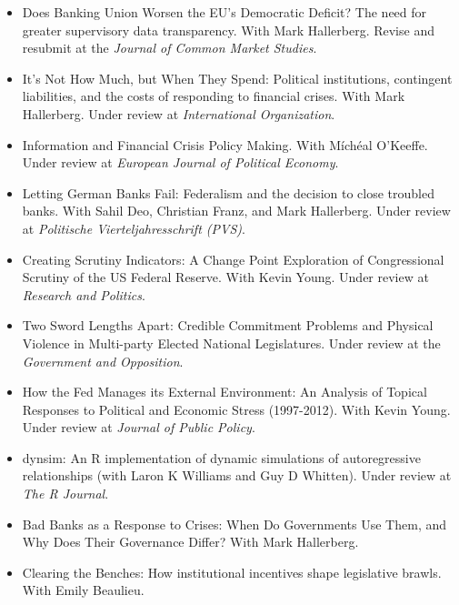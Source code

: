 \documentclass[a4paper]{article}
\begin{document}
{{\begin{itemize}
    \item Does Banking Union Worsen the EU's Democratic Deficit? The need for greater supervisory data transparency. With Mark Hallerberg. Revise and resubmit at the {\emph{Journal of Common Market Studies}}.

    \item It's Not How Much, but When They Spend: Political institutions, contingent liabilities, and the costs of responding to financial crises. With Mark Hallerberg. Under review at \emph{International Organization}.

    \item Information and Financial Crisis Policy Making. With M\'{i}ch\'{e}al O'Keeffe. Under review at {\emph{European Journal of Political Economy}}.

    \item Letting German Banks Fail: Federalism and the decision to close troubled banks. With Sahil Deo, Christian Franz, and Mark Hallerberg. Under review at \emph{Politische Vierteljahresschrift (PVS)}.

    \item Creating Scrutiny Indicators: A Change Point Exploration of Congressional Scrutiny of the US Federal Reserve. With Kevin Young. Under review at \emph{Research and Politics}.

    \item Two Sword Lengths Apart: Credible Commitment Problems and Physical Violence in Multi-party Elected National Legislatures. Under review at the {\emph{Government and Opposition}}.

    \item How the Fed Manages its External Environment: An Analysis of Topical Responses to Political and Economic Stress (1997-2012). With Kevin Young. Under review at \emph{Journal of Public Policy}.

    \item dynsim: An R implementation of dynamic simulations of autoregressive relationships (with Laron K Williams and Guy D Whitten). Under review at \emph{The R Journal}.

    \item Bad Banks as a Response to Crises: When Do Governments Use Them, and Why Does Their Governance Differ? With Mark Hallerberg.

    \item Clearing the Benches: How institutional incentives shape legislative brawls. With Emily Beaulieu.

\end{itemize}

}}
\end{document}
